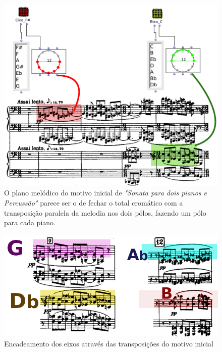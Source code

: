 \documentclass[
	12pt,				%
	openright,			%
	twoside,			%
	a4paper,			%
	english,			%
	french,				%
	spanish,			%
	brazil				%
	]{abntex2}
\begin{document}
\begin{figure}[!h]
	\caption{\label{fig_grafico}O plano melódico do motivo inicial de \textit{"Sonata para dois pianos e Percussão"}  parece ser o de fechar o total cromático com a transposição paralela da melodia nos dois pólos, fazendo um pólo para cada piano. }
	\begin{center}
	    \includegraphics[scale=0.3]{axis/sonata2pianos_dofasus.png}
	\end{center}
\end{figure}


\begin{figure}[!h]
	\caption{\label{fig_grafico}Encadeamento dos eixos através das transposições do motivo inicial }
	\begin{center}
	    \includegraphics[scale=0.4]{axis/sonata2pianos_mm9-12.png}
	\end{center}
\end{figure}
\end{document}
